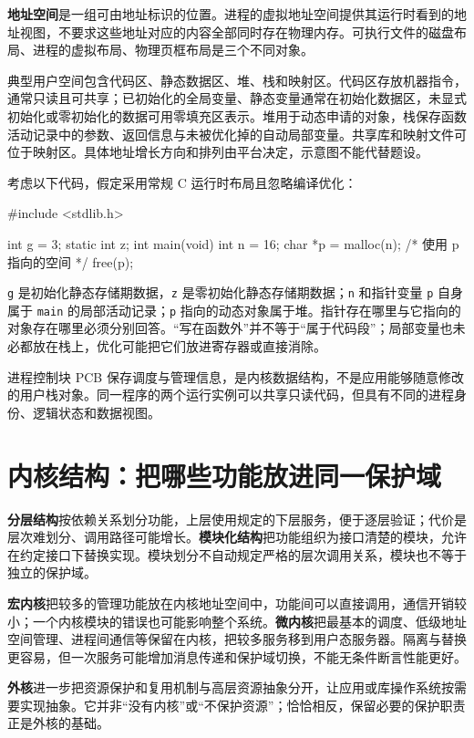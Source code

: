 \textbf{地址空间}是一组可由地址标识的位置。进程的虚拟地址空间提供其运行时看到的地址视图，不要求这些地址对应的内容全部同时存在物理内存。可执行文件的磁盘布局、进程的虚拟布局、物理页框布局是三个不同对象。

典型用户空间包含代码区、静态数据区、堆、栈和映射区。代码区存放机器指令，通常只读且可共享；已初始化的全局变量、静态变量通常在初始化数据区，未显式初始化或零初始化的数据可用零填充区表示。堆用于动态申请的对象，栈保存函数活动记录中的参数、返回信息与未被优化掉的自动局部变量。共享库和映射文件可位于映射区。具体地址增长方向和排列由平台决定，示意图不能代替题设。

考虑以下代码，假定采用常规 C 运行时布局且忽略编译优化：

\begin{codeblock}[language=C]
#include <stdlib.h>

int g = 3;
static int z;
int main(void) {
    int n = 16;
    char *p = malloc(n);
    /* 使用 p 指向的空间 */
    free(p);
}
\end{codeblock}

\texttt{g} 是初始化静态存储期数据，\texttt{z} 是零初始化静态存储期数据；\texttt{n} 和指针变量 \texttt{p} 自身属于 \texttt{main} 的局部活动记录；\texttt{p} 指向的动态对象属于堆。指针存在哪里与它指向的对象存在哪里必须分别回答。``写在函数外''并不等于``属于代码段''；局部变量也未必都放在栈上，优化可能把它们放进寄存器或直接消除。

进程控制块 PCB 保存调度与管理信息，是内核数据结构，不是应用能够随意修改的用户栈对象。同一程序的两个运行实例可以共享只读代码，但具有不同的进程身份、逻辑状态和数据视图。

\section{内核结构：把哪些功能放进同一保护域}\label{OS01-1-8}

\textbf{分层结构}按依赖关系划分功能，上层使用规定的下层服务，便于逐层验证；代价是层次难划分、调用路径可能增长。\textbf{模块化结构}把功能组织为接口清楚的模块，允许在约定接口下替换实现。模块划分不自动规定严格的层次调用关系，模块也不等于独立的保护域。

\textbf{宏内核}把较多的管理功能放在内核地址空间中，功能间可以直接调用，通信开销较小；一个内核模块的错误也可能影响整个系统。\textbf{微内核}把最基本的调度、低级地址空间管理、进程间通信等保留在内核，把较多服务移到用户态服务器。隔离与替换更容易，但一次服务可能增加消息传递和保护域切换，不能无条件断言性能更好。

\textbf{外核}进一步把资源保护和复用机制与高层资源抽象分开，让应用或库操作系统按需要实现抽象。它并非``没有内核''或``不保护资源''；恰恰相反，保留必要的保护职责正是外核的基础。

